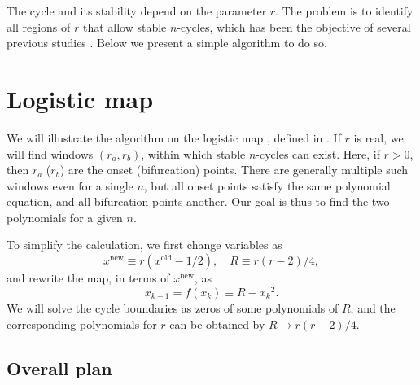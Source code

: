 \documentclass[twocolumn]{revtex4-1}
\begin{document}
The cycle and its stability depend on the parameter $r$.
%
The problem is to identify
  all regions of $r$ that allow stable $n$-cycles,
  which has been the objective of several previous
  studies
  \cite{brown1, stephenson,
  saha, bechhoefer, gordon, burm, zhang, bailey, kk1, lewis}.
Below we present a simple algorithm to do so.







\section{\label{sec:logmap}Logistic map}


We will illustrate the algorithm on the logistic map \cite{may, strogatz},
  defined in .
If $r$ is real,
  we will find windows $(r_a, r_b)$,
    within which stable $n$-cycles can exist.
%
Here, if $r > 0$, then
  $r_a$ ($r_b$) are the onset (bifurcation) points.
%
There are generally multiple such windows even for a single $n$,
but all onset points satisfy the same polynomial equation,
  and all bifurcation points another.
%
Our goal is thus to find the two polynomials for a given $n$.


To simplify the calculation, we first change variables \cite{mandelbrot, brown1, saha} as
%
\[
    x^{\mathrm{new}} \equiv r(x^{\mathrm{old}} - 1/2),
    \quad R \equiv r(r-2)/4,
\]
%
and rewrite the map, in terms of $x^{\mathrm{new}}$, as
%
\begin{equation}
  x_{k+1} = f(x_k) \equiv R - {x_k}^2.
\label{eq:logmaps}
\end{equation}
%
%
We will solve the cycle boundaries as zeros of some polynomials of $R$,
and the corresponding polynomials for $r$ can be obtained by $R \rightarrow r(r-2)/4$.
%
%






\subsection{Overall plan}
\end{document}
